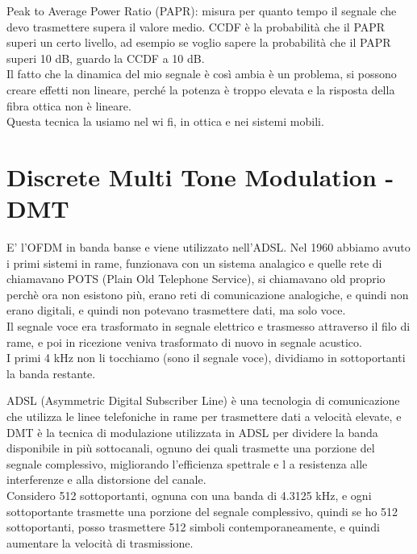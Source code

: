 Peak to Average Power Ratio (PAPR): misura per quanto tempo il segnale che devo trasmettere supera il valore medio. 
CCDF è la probabilità che il PAPR superi un certo livello, ad esempio se voglio sapere la probabilità che il PAPR superi 10 dB, guardo la CCDF a 10 dB.\\

Il fatto che la dinamica del mio segnale è così ambia è un problema, si possono creare effetti non lineare, perché la potenza è troppo elevata e la risposta 
della fibra ottica non è lineare.\\

Questa tecnica la usiamo nel wi fi, in ottica e nei sistemi mobili.

\section{Discrete Multi Tone Modulation - DMT}
E' l'OFDM in banda banse e viene utilizzato nell'ADSL.
Nel 1960 abbiamo avuto i primi sistemi in rame, funzionava con un sistema analagico e quelle
rete di chiamavano POTS (Plain Old Telephone Service), si chiamavano old proprio perchè ora 
non esistono più, erano reti di comunicazione analogiche, e quindi non erano digitali, e quindi non potevano trasmettere dati, ma solo voce.\\

Il segnale voce era trasformato in segnale elettrico e trasmesso attraverso il filo di rame, e poi in ricezione veniva trasformato di nuovo in segnale acustico.\\

I primi 4 kHz non li tocchiamo (sono il segnale voce), dividiamo in sottoportanti la banda restante.

ADSL (Asymmetric Digital Subscriber Line) è una tecnologia di comunicazione che utilizza le linee telefoniche in rame 
per trasmettere dati a velocità elevate, e DMT è la tecnica di modulazione utilizzata in ADSL per dividere la banda 
disponibile in più sottocanali, ognuno dei quali trasmette una porzione del segnale complessivo, migliorando l'efficienza spettrale e l
a resistenza alle interferenze e alla distorsione del canale.\\

Considero 512 sottoportanti, ognuna con una banda di 4.3125 kHz, e ogni sottoportante trasmette una porzione del segnale complessivo, 
quindi se ho 512 sottoportanti, posso trasmettere 512 simboli contemporaneamente, e quindi aumentare la velocità di trasmissione.\\

